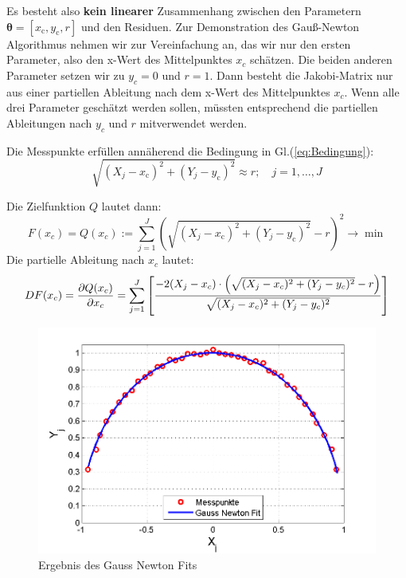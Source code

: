 Es besteht also \textbf{kein linearer} Zusammenhang zwischen den Parametern
$\boldsymbol\theta = [x_\mathrm{c},y_\mathrm{c},r]$ und den
Residuen.
Zur Demonstration des Gauß-Newton Algorithmus nehmen wir zur Vereinfachung an, das wir nur den ersten Parameter, also den
x-Wert des Mittelpunktes $x_c$ schätzen. Die beiden anderen
Parameter setzen wir zu $y_c=0$ und $r=1$.
Dann besteht die Jakobi-Matrix nur aus einer partiellen Ableitung nach dem x-Wert des Mittelpunktes $x_c$. Wenn alle drei Parameter geschätzt werden sollen, müssten entsprechend die partiellen Ableitungen nach $y_c$ und $r$ mitverwendet werden.

Die Messpunkte erfüllen annäherend die Bedingung in Gl.(\ref{eq:Bedingung}):
\[
\sqrt{(X_j-x_\mathrm{c})^2+(Y_j-y_\mathrm{c})^2} \approx r; \quad j=1,\ldots,J
\]

Die Zielfunktion $Q$ lautet dann:
\begin{equation}
	F(x_c) = Q(x_c) := \sum_{j=1}^{J} \left( \sqrt{(X_j-x_\mathrm{c})^2+(Y_j-y_\mathrm{c})^2}-r\right)^2
	\rightarrow \min
\end{equation}
Die partielle Ableitung nach $x_c$ lautet:
\begin{equation}
	DF(x_c) = \frac{\partial Q(x_c)}{\partial x_c} = \displaystyle\sum_{j=1}^{J} \left[
	\frac{-2(X_j-x_c)\cdot \left( \sqrt{(X_j-x_c)^2 +(Y_j-y_c)^2}-r\right)}
	{\sqrt{(X_j-x_c)^2+(Y_j-y_c)^2}} \right]
\end{equation}
\begin{figure}[!htp]
	\begin{center}
		\includegraphics[width=140mm]{03_vorlesung/media/Kreisfit_Gauss_Newton.png}
		\caption{Ergebnis des Gauss Newton Fits}
		\label{fig:Kreisfit_Gauss_Newton}
	\end{center}
\end{figure}
